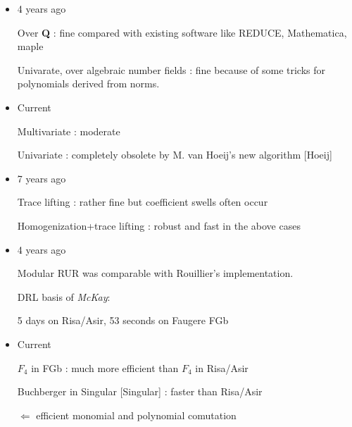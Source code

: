 \begin{slide}{}

\begin{itemize}
\item 4 years ago

Over {\bf Q} : fine compared with existing software
like REDUCE, Mathematica, maple

Univarate, over algebraic number fields :
fine because of some tricks for polynomials
derived from norms.

\item Current

Multivariate : moderate

Univariate : completely obsolete by M. van Hoeij's new algorithm
[Hoeij]
\end{itemize}

\end{slide}

\begin{slide}{}

\begin{itemize}
\item 7 years ago

Trace lifting : rather fine but coefficient swells often occur

Homogenization+trace lifting : robust and fast in the above cases

\item 4 years ago

Modular RUR was comparable with Rouillier's implementation.

DRL basis of {\it McKay}: 

5 days on Risa/Asir, 53 seconds on Faugere FGb
\item Current

$F_4$ in FGb : much more efficient than $F_4$ in Risa/Asir

Buchberger in Singular [Singular] : faster than Risa/Asir

$\Leftarrow$ efficient monomial and polynomial comutation

\end{itemize}
\end{slide}

